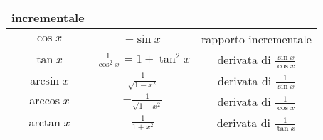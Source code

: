 \documentclass[a4paper,12pt, oneside]{book}
\begin{document}
{\begin{tabular}{|c|c|c|}
                                                                                                                                                                                                                                                                                                                                                                                                               incrementale \\[1ex] \hline $\cos x$ & $-\sin x$ & rapporto incrementale \\[1ex]
    \hline $\tan x$ & $\frac{1}{\cos^2 x}\mbox{ = } 1+\tan^2 x$ & derivata di
                                                                  $\frac{\sin x}{\cos x}$ \\[1ex] \hline $\arcsin x$ & $\frac{1}{\sqrt{1-x^2}}$ &
                                                                                                                                                  derivata di $\frac{1}{\sin x}$ \\[1ex] \hline $\arccos x$ &
                                                                                                                                                                                                              $-\frac{1}{\sqrt{1-x^2}}$ & derivata di $\frac{1}{\cos x}$ \\[1ex] \hline
    $\arctan x$ & $\frac{1}{1+x^2}$ & derivata di $\frac{1}{\tan x}$ \\[1ex] \hline
  \end{tabular} }
\newpage
\end{document}
